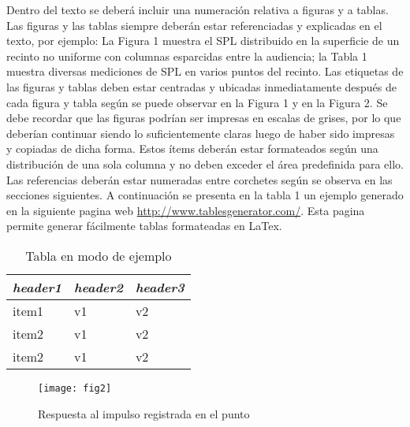 Dentro del texto se deberá incluir una numeración relativa a figuras y a tablas. Las figuras y las tablas siempre deberán estar referenciadas y explicadas en el texto, por ejemplo: La Figura 1 muestra el SPL distribuido en la superficie de un recinto no uniforme con columnas esparcidas entre la audiencia; la Tabla 1 muestra diversas mediciones de SPL en varios puntos del recinto.
Las etiquetas de las figuras y tablas deben estar centradas y ubicadas inmediatamente después de cada figura y tabla según se puede observar en la Figura 1 y en la Figura 2. 
Se debe recordar que las figuras podrían ser impresas en escalas de grises, por lo que deberían continuar siendo lo suficientemente claras luego de haber sido impresas y copiadas de dicha forma.
Estos ítems deberán estar formateados según una distribución de una sola columna y no deben exceder el área predefinida para ello.
Las referencias deberán estar numeradas entre corchetes según se observa en las secciones siguientes. A continuación se presenta en la tabla 1 un ejemplo generado en la siguiente pagina web \url{http://www.tablesgenerator.com/}. Esta pagina permite generar fácilmente tablas formateadas en LaTex.
            \begin{table}[H]
                \centering
                \caption{Tabla en modo de ejemplo}\label{tab:label}
                \begin{tabular}{lll}
                \toprule
                \emph{header1} & \emph{header2} & \emph{header3} \\
                \midrule
                    item1 & v1  & v2   \\
                    item2 & v1  & v2   \\
                    item2 & v1  & v2   \\
                \bottomrule
            \end{tabular}
            \end{table}
            
            \begin{figure}[H]
                    \texttt{[image: fig2]}
                    \caption{Respuesta al impulso registrada en el punto}
                    \centering
                \end{figure}
